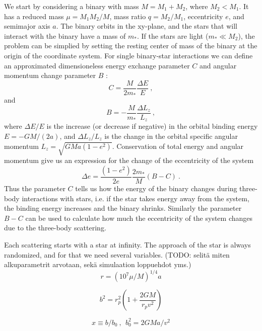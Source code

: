 \documentclass[english, oneside]{HYgradu}
\begin{document}
We start by considering a binary with mass $M = M_1 + M_2$, where $M_2 < M_1$. It has a reduced mass $\mu = M_1 M_2 / M$, mass ratio $q = M_2/M_1$, eccentricity $e$, and semimajor axis $a$. The binary orbits in the xy-plane, and the stars that will interact with the binary have a mass of $m_{\ast}$. If the stars are light ($m_{\ast} \ll M_2$), the problem can be simplied by setting the resting center of mass of the binary at the origin of the coordinate system. For single binary-star interactions we can define an approximated dimensioneless energy exchange parameter $C$ and angular momentum change parameter $B$ \citep{hills:1983}:
\begin{equation}
C = \frac{M}{2m_{\ast}} \frac{\Delta E}{E} \ ,
\end{equation}
and 
\begin{equation}
B = - \frac{M}{m_{\ast}} \frac{\Delta L_z}{L_z} \ ,
\end{equation}
where $\Delta E / E$ is the increase (or decrease if negative) in the orbital binding energy $E = -GM/(2a)$, and $\Delta L_z / L_z$ is the change in the orbital specific angular momentum $L_z = \sqrt{GMa(1-e^2)}$. Conservation of total energy and angular momentum give us an expression for the change of the eccentricity of the system
\begin{equation}
\Delta e = \frac{(1-e^2)}{2e} \frac{2 m_{\ast}}{M} (B-C) \ .
\end{equation}
Thus the parameter $C$ tells us how the energy of the binary changes during three-body interactions with stars, i.e. if the star takes energy away from the system, the binding energy increases and the binary shrinks. Similarly the parameter $B-C$ can be used to calculate how much the eccentricity of the system changes due to the three-body scattering.

Each scattering starts with a star at infinity. The approach of the star is always randomized, and for that we need several variables. (TODO: selitä miten alkuparametrit arvotaan, sekä simulaation loppuehdot yms.)
\begin{equation}
r = (10^7 \mu/M)^{1/4} a
\end{equation}

\begin{equation}
b^2 = r_p^2 \left( 1 + \frac{2GM}{r_p v^2} \right)
\end{equation}

\begin{equation}
x \equiv b/b_0 \ , \ \ b_0^2 = 2GMa/v^2
\end{equation}
\end{document}
